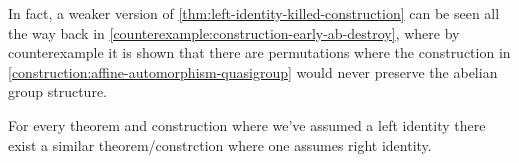 \begin{remark}
    In fact, a weaker version of \autoref{thm:left-identity-killed-construction} can be seen all the way back in \autoref{counterexample:construction-early-ab-destroy}, where by counterexample it is shown that there are permutations where the construction in \autoref{construction:affine-automorphism-quasigroup} would never preserve the abelian group structure.
\end{remark}

\begin{remark}
    For every theorem and construction where we've assumed a left identity there exist a similar theorem/constrction where one assumes right identity.
\end{remark}
